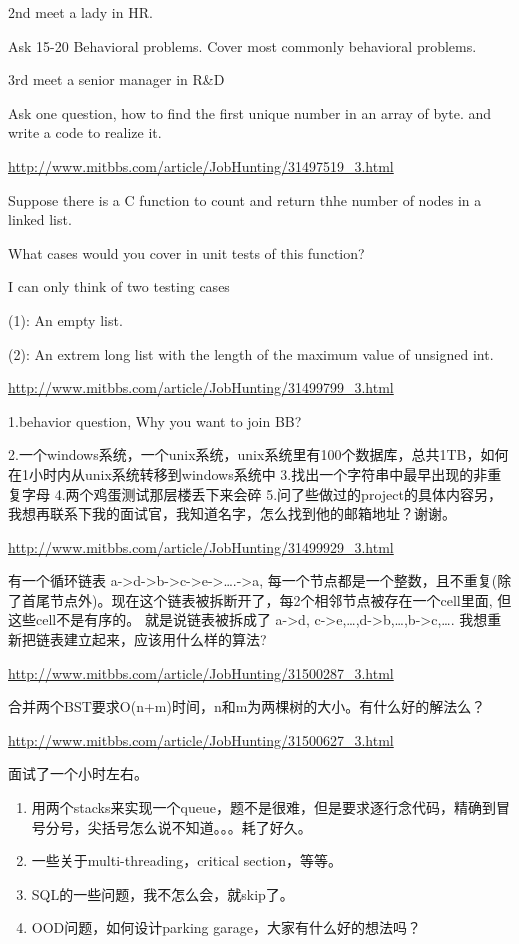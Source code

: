 \documentclass[12pt]{book}
\begin{document}
2nd meet a lady in HR.

Ask 15-20 Behavioral problems. Cover most commonly behavioral problems.

3rd meet a senior manager in R\&D

Ask one question, how to find the first unique number in an array of byte. and write a code to realize it.

\url{http://www.mitbbs.com/article/JobHunting/31497519_3.html}

Suppose there is a C function to count and return thhe number of nodes in a linked list.

What cases would you cover in unit tests of this function?

I can only think of two testing cases

(1): An empty list.

(2): An extrem long list with the length of the maximum value of unsigned int.

\url{http://www.mitbbs.com/article/JobHunting/31499799_3.html}

1.behavior question, Why you want to join BB?

2.一个windows系统，一个unix系统，unix系统里有100个数据库，总共1TB，如何在1小时内从unix系统转移到windows系统中
3.找出一个字符串中最早出现的非重复字母
4.两个鸡蛋测试那层楼丢下来会碎
5.问了些做过的project的具体内容另，我想再联系下我的面试官，我知道名字，怎么找到他的邮箱地址？谢谢。

\url{http://www.mitbbs.com/article/JobHunting/31499929_3.html}

有一个循环链表 a->d->b->c->e->\ldots{}.->a, 每一个节点都是一个整数，且不重复(除了首尾节点外)。现在这个链表被拆断开了，每2个相邻节点被存在一个cell里面, 但这些cell不是有序的。 就是说链表被拆成了 a->d, c->e,\ldots{},d->b,\ldots{},b->c,\ldots{}. 我想重新把链表建立起来，应该用什么样的算法?

\url{http://www.mitbbs.com/article/JobHunting/31500287_3.html}

合并两个BST要求O(n+m)时间，n和m为两棵树的大小。有什么好的解法么？

\url{http://www.mitbbs.com/article/JobHunting/31500627_3.html}

面试了一个小时左右。

\begin{enumerate}
\item 用两个stacks来实现一个queue，题不是很难，但是要求逐行念代码，精确到冒号分号，尖括号怎么说不知道。。。耗了好久。
\item 一些关于multi-threading，critical section，等等。
\item SQL的一些问题，我不怎么会，就skip了。
\item OOD问题，如何设计parking garage，大家有什么好的想法吗？
\end{enumerate}
\end{document}
